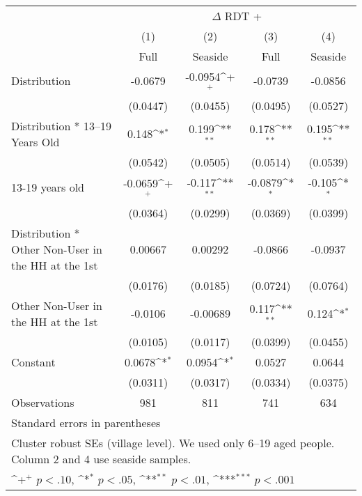 {
\def\sym#1{\ifmmode^{#1}\else\(^{#1}\)\fi}
\begin{tabular}{l*{4}{c}}
\hline\hline
                    &\multicolumn{4}{c}{$\Delta $ RDT +}                                                    \\
                    &\multicolumn{1}{c}{(1)}         &\multicolumn{1}{c}{(2)}         &\multicolumn{1}{c}{(3)}         &\multicolumn{1}{c}{(4)}         \\
                    &        Full         &     Seaside         &        Full         &     Seaside         \\
\hline
Distribution        &     -0.0679         &     -0.0954\sym{+}  &     -0.0739         &     -0.0856         \\
                    &    (0.0447)         &    (0.0455)         &    (0.0495)         &    (0.0527)         \\
[1em]
Distribution * 13--19 Years Old&       0.148\sym{*}  &       0.199\sym{**} &       0.178\sym{**} &       0.195\sym{**} \\
                    &    (0.0542)         &    (0.0505)         &    (0.0514)         &    (0.0539)         \\
[1em]
13-19 years old     &     -0.0659\sym{+}  &      -0.117\sym{**} &     -0.0879\sym{*}  &      -0.105\sym{*}  \\
                    &    (0.0364)         &    (0.0299)         &    (0.0369)         &    (0.0399)         \\
[1em]
Distribution * Other Non-User in the HH at the 1st&     0.00667         &     0.00292         &     -0.0866         &     -0.0937         \\
                    &    (0.0176)         &    (0.0185)         &    (0.0724)         &    (0.0764)         \\
[1em]
Other Non-User in the HH at the 1st&     -0.0106         &    -0.00689         &       0.117\sym{**} &       0.124\sym{*}  \\
                    &    (0.0105)         &    (0.0117)         &    (0.0399)         &    (0.0455)         \\
[1em]
Constant            &      0.0678\sym{*}  &      0.0954\sym{*}  &      0.0527         &      0.0644         \\
                    &    (0.0311)         &    (0.0317)         &    (0.0334)         &    (0.0375)         \\
\hline
Observations        &         981         &         811         &         741         &         634         \\
\hline\hline
\multicolumn{5}{l}{\footnotesize Standard errors in parentheses}\\
\multicolumn{5}{l}{\footnotesize Cluster robust SEs (village level). We used only 6--19 aged people. Column 2 and 4 use seaside samples.}\\
\multicolumn{5}{l}{\footnotesize \sym{+} \(p<.10\), \sym{*} \(p<.05\), \sym{**} \(p<.01\), \sym{***} \(p<.001\)}\\
\end{tabular}
}
